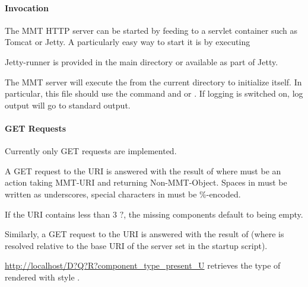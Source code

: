 \paragraph{Invocation}
The MMT HTTP server can be started by feeding  to a servlet container such as Tomcat or Jetty. A particularly easy way to start it is by executing
\begin{center}
\end{center}
Jetty-runner is provided in the main directory or available as part of Jetty.

The MMT server will execute the  from the current directory to initialize itself. In particular, this file should use the command  and  or . If logging is switched on, log output will go to standard output.

\paragraph{GET Requests}
Currently only GET requests are implemented.

A GET request to the URI  is answered with the result of  where  must be an action taking MMT-URI and returning Non-MMT-Object. Spaces in  must be written as underscores, special characters in  must be \%-encoded.

If the URI contains less than $3$ $?$, the missing components default to being empty.

Similarly, a GET request to the URI  is answered with the result of  (where  is resolved relative to the base URI of the server set in the startup script).

\begin{example}
\url{http://localhost/D?Q?R?component_type_present_U}
retrieves the type of  rendered with style .
\end{example}